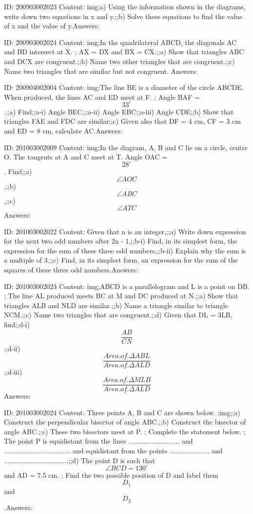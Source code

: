 \documentclass{article}
\begin{document}
ID: 200903002023
Content:
img;a) Using the information shown in the diagrams, write down two equations in x and y.;;b) Solve these equations to find the value of x and the value of y.Answers:

ID: 200903002024
Content:
img;In the quadrilateral ABCD, the diagonals AC and BD intersect at X. ; AX = DX and BX = CX.;;a) Show that triangles ABC and DCX are congruent.;;b) Name two other triangles that are congruent.;;c) Name two triangles that are similar but not congruent. Answers:

ID: 200904002004
Content:
img;The line BE is a diameter of the circle ABCDE. When produced, the lines AC and ED meet at F. ; Angle BAF = $$33^{\circ}$$.;;a) Find;;a-i) Angle BEC,;;a-ii) Angle EBC;;a-iii) Angle CDE;;b) Show that triangles FAE and FDC are similar;;c) Given also that DF = 4 cm, CF = 3 cm and ED = 8 cm, calculate AC.Answers:

ID: 201003002009
Content:
img;In the diagram, A, B and C lie on a circle, centre O. The tangents at A and C meet at T. Angle OAC = $$28^{\circ}$$. Find;;a) $$\angle AOC$$,;;b) $$\angle ABC$$,;;c) $$\angle ATC$$Answers:

ID: 201003002022
Content:
Given that n is an integer,;;a) Write down expression for the next two odd numbers after 2n - 1,;;b-i) Find, in its simplest form, the expression for the sum of these three odd numbers,;;b-ii) Explain why the sum is a multiple of 3.;;c) Find, in its simplest form, an expression for the sum of the squares of these three odd numbers.Answers:

ID: 201003002023
Content:
img;ABCD is a parallelogram and L is a point on DB. ; The line AL produced meets BC at M and DC produced at N.;;a) Show that triangles ALB and NLD are similar.;;b) Name a triangle similar to triangle NCM.;;c) Name two triangles that are congruent.;;d) Given that DL = 3LB, find;;d-i) $$\frac{AB}{CN}$$;;d-ii) $$\frac{Area.of.\Delta ABL}{Area.of.\Delta ALD}$$ ;;d-iii) $$\frac{Area.of.\Delta MLB}{Area.of.\Delta ALD}$$ Answers:

ID: 201003002024
Content:
Three points A, B and C are shown below. ;img;;a) Construct the perpendicular bisector of angle ABC.;;b) Construct the bisector of angle ABC.;;c) These two bisectors meet at P. ; Complete the statement below. ; The point P is equidistant from the lines ........................... and  ................................... and equidistant from the points ..................... and ..................................;;d) The point D is such that $$\angle BCD = 130^{\circ}$$ and AD = 7.5 cm. ; Find the two possible position of D and label them $$D_1$$ and $$D_2$$.Answers:
\end{document}
